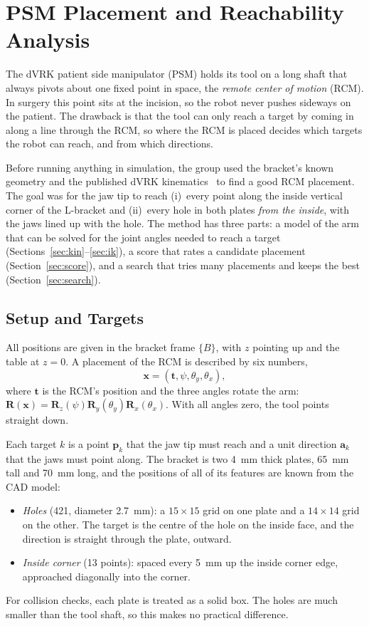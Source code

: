 \section{PSM Placement and Reachability Analysis}\label{sec:reach}

The dVRK patient side manipulator (PSM) holds its tool on a long shaft that
always pivots about one fixed point in space, the \emph{remote center of
motion} (RCM). In surgery this point sits at the incision, so the robot never
pushes sideways on the patient. The drawback is that the tool can only reach a
target by coming in along a line through the RCM, so where the RCM is placed
decides which targets the robot can reach, and from which directions.

Before running anything in simulation, the group used the bracket's known
geometry and the published dVRK kinematics~\cite{kazanzides2014dvrk,sawIntuitive}
to find a good RCM placement. The goal was for the jaw tip to reach
(i)~every point along the inside vertical corner of the L-bracket and
(ii)~every hole in both plates \emph{from the inside}, with the jaws lined up
with the hole. The method has three parts: a model of the arm that can be
solved for the joint angles needed to reach a target
(Sections~\ref{sec:kin}--\ref{sec:ik}), a score that rates a candidate
placement (Section~\ref{sec:score}), and a search that tries many placements
and keeps the best (Section~\ref{sec:search}).

\subsection{Setup and Targets}\label{sec:targets}
All positions are given in the bracket frame $\{B\}$, with $z$ pointing up
and the table at $z=0$. A placement of the RCM is described by six numbers,
\begin{equation}
  \mathbf x=(\mathbf t,\psi,\theta_y,\theta_x),
\end{equation}
where $\mathbf t$ is the RCM's position and the three angles rotate the arm:
$\mathbf R(\mathbf x)=\mathbf R_z(\psi)\mathbf R_y(\theta_y)\mathbf R_x(\theta_x)$.
With all angles zero, the tool points straight down.

Each target $k$ is a point $\mathbf p_k$ that the jaw tip must reach and a
unit direction $\mathbf a_k$ that the jaws must point along. The bracket is
two \SI{4}{mm} thick plates, \SI{65}{mm} tall and \SI{70}{mm} long, and the
positions of all of its features are known from the CAD model:
\begin{itemize}
  \item \textit{Holes} (421, diameter \SI{2.7}{mm}): a $15\times15$ grid on
    one plate and a $14\times14$ grid on the other. The target is the
    centre of the hole on the inside face, and the direction is straight
    through the plate, outward.
  \item \textit{Inside corner} (13 points): spaced every \SI{5}{mm} up the
    inside corner edge, approached diagonally into the corner.
\end{itemize}
For collision checks, each plate is treated as a solid box. The holes are much
smaller than the tool shaft, so this makes no practical difference.

